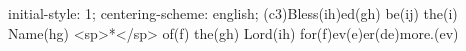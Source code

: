 initial-style: 1;
centering-scheme: english;
(c3)Bless(ih)ed(gh) be(ij) the(i) Name(hg) <sp>*</sp> of(f) the(gh) Lord(ih) for(f)ev(e)er(de)more.(ev)
